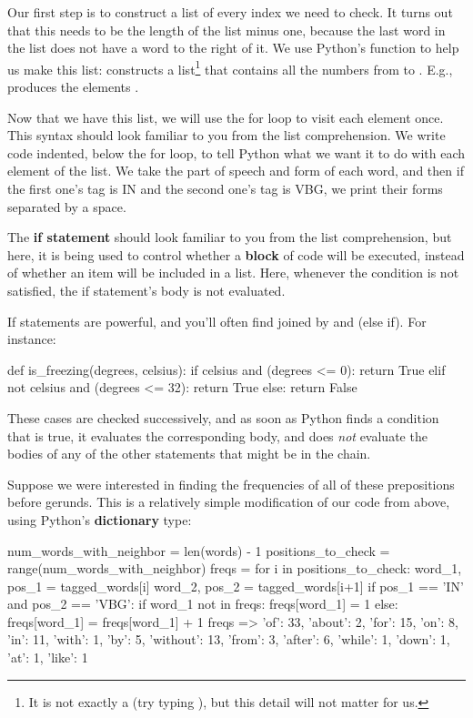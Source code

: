 \documentclass{article}
\newcommand\pyi\pythoninline
\begin{document}
\noindent Our first step is to construct a list of every index we need to check. It turns out that this needs to be the length of the list minus one, because the last word in the list does not have a word to the right of it. We use Python's \pyi{range} function to help us make this list: \pyi{range(n)} constructs a list\footnote{It is not exactly a \pyi{list} (try typing \pyi{type(range(5))}), but this detail will not matter for us.} that contains all the numbers from \pyi{0} to \pyi{n - 1}. E.g., \pyi{range(5)} produces the elements \pyi{[0, 1, 2, 3, 4]}.

Now that we have this list, we will use the for loop to visit each element once. This syntax should look familiar to you from the list comprehension. We write code indented, below the for loop, to tell Python what we want it to do with each element of the list. We take the part of speech and form of each word, and then if the first one's tag is IN and the second one's tag is VBG, we print their forms separated by a space. 

The \textbf{if statement} should look familiar to you from the list comprehension, but here, it is being used to control whether a \textbf{block} of code will be executed, instead of whether an item will be included in a list. Here, whenever the condition is not satisfied, the if statement's body is not evaluated.

If statements are powerful, and you'll often find \pyi{if} joined by \pyi{else} and \pyi{elif} (else if).  For instance:

\begin{python}
def is_freezing(degrees, celsius):
    if celsius and (degrees <= 0):
        return True
    elif not celsius and (degrees <= 32):
        return True
    else:
        return False
\end{python}

\noindent These cases are checked successively, and as soon as Python finds a condition that is true, it evaluates the corresponding body, and does \emph{not} evaluate the bodies of any of the other statements that might be in the chain. 

Suppose we were interested in finding the frequencies of all of these prepositions before gerunds. This is a relatively simple modification of our code from above, using Python's \textbf{dictionary} type:

\begin{python}
num_words_with_neighbor = len(words) - 1
positions_to_check = range(num_words_with_neighbor)
freqs = {}
for i in positions_to_check:
    word_1, pos_1 = tagged_words[i]
    word_2, pos_2 = tagged_words[i+1]
    if pos_1 == 'IN' and pos_2 == 'VBG':
        if word_1 not in freqs:
            freqs[word_1] = 1
        else:
            freqs[word_1] = freqs[word_1] + 1
freqs
=> {'of': 33, 'about': 2, 'for': 15, 'on': 8, 
'in': 11, 'with': 1, 'by': 5, 'without': 13, 
'from': 3,  'after': 6, 'while': 1, 'down': 1, 
'at': 1, 'like': 1}
\end{python}
\end{document}
